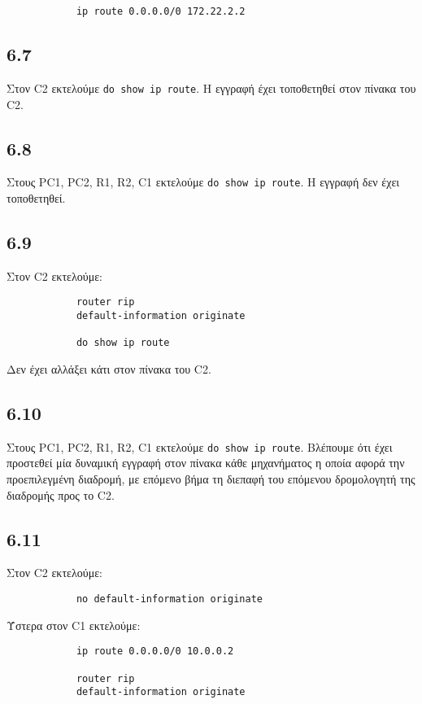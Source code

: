 \documentclass[a4paper, 12pt]{article}
\begin{document}
		\begin{verbatim}
			ip route 0.0.0.0/0 172.22.2.2
		\end{verbatim}

	\subsection*{6.7}
		Στον C2 εκτελούμε \verb|do show ip route|. Η εγγραφή έχει τοποθετηθεί στον πίνακα του C2.

	\subsection*{6.8}
		Στους PC1, PC2, R1, R2, C1 εκτελούμε \verb|do show ip route|. Η εγγραφή δεν έχει τοποθετηθεί.

	\subsection*{6.9}
		Στον C2 εκτελούμε: 
		
		\begin{verbatim}
			router rip
			default-information originate
			
			do show ip route
		\end{verbatim}
		
		Δεν έχει αλλάξει κάτι στον πίνακα του C2.

	\subsection*{6.10}
		Στους PC1, PC2, R1, R2, C1 εκτελούμε \verb|do show ip route|. Βλέπουμε ότι έχει προστεθεί μία δυναμική εγγραφή στον πίνακα κάθε μηχανήματος η οποία αφορά την προεπιλεγμένη διαδρομή, με επόμενο βήμα τη διεπαφή του επόμενου δρομολογητή της διαδρομής προς το C2.

	\subsection*{6.11}
		Στον C2 εκτελούμε:
		
		\begin{verbatim}
			no default-information originate
		\end{verbatim}
		
		Ύστερα στον C1 εκτελούμε:
		
		\begin{verbatim}
			ip route 0.0.0.0/0 10.0.0.2
			
			router rip
			default-information originate
		\end{verbatim}
\end{document}
